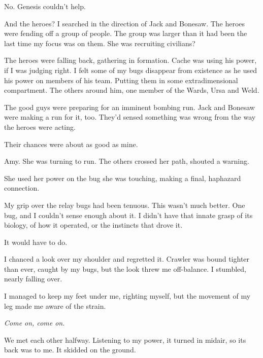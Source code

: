 No.  Genesis couldn't help.



And the heroes?  I searched in the direction of Jack and Bonesaw.  The heroes were fending off a group of people.  The group was larger than it had been the last time my focus was on them.  She was recruiting civilians?



The heroes were falling back, gathering in formation.  Cache was using his power, if I was judging right.  I felt some of my bugs disappear from existence as he used his power on members of his team.  Putting them in some extradimensional compartment.  The others around him, one member of the Wards, Ursa and Weld.



The good guys were preparing for an imminent bombing run.  Jack and Bonesaw were making a run for it, too.  They'd sensed something was wrong from the way the heroes were acting.



Their chances were about as good as mine.



Amy.  She was turning to run.  The others crossed her path, shouted a warning.



She used her power on the bug she was touching, making a final, haphazard connection.



My grip over the relay bugs had been tenuous.  This wasn't much better.  One bug, and I couldn't sense enough about it.  I didn't have that innate grasp of its biology, of how it operated, or the instincts that drove it.



It would have to do.



I chanced a look over my shoulder and regretted it.  Crawler was bound tighter than ever, caught by my bugs, but the look threw me off-balance.  I stumbled, nearly falling over.



I managed to keep my feet under me, righting myself, but the movement of my leg made me aware of the strain.



\emph{Come on, come on}.



We met each other halfway.  Listening to my power, it turned in midair, so its back was to me.  It skidded on the ground.



